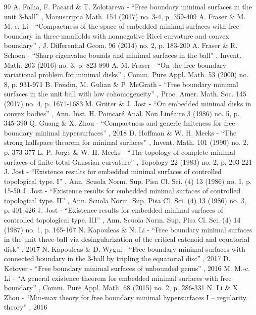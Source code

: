\documentclass[10pt]{amsart}
\theoremstyle{definition}
\begin{document}
\begin{thebibliography}{99}
 A. Folha, F. Pacard \& T. Zolotareva - “Free boundary minimal surfaces in the unit 3-ball” , Manuscripta Math. 154 (2017) no. 3-4, p. 359-409
 A. Fraser \& M. M.-c. Li - “Compactness of the space of embedded minimal surfaces with free boundary in three-manifolds with nonnegative Ricci curvature and convex boundary” , J. Differential Geom. 96 (2014) no. 2, p. 183-200
 A. Fraser \& R. Schoen - “Sharp eigenvalue bounds and minimal surfaces in the ball” , Invent. Math. 203 (2016) no. 3, p. 823-890
 A. M. Fraser - “On the free boundary variational problem for minimal disks” , Comm. Pure Appl. Math. 53 (2000) no. 8, p. 931-971
 B. Freidin, M. Gulian \& P. McGrath - “Free boundary minimal surfaces in the unit ball with low cohomogeneity” , Proc. Amer. Math. Soc. 145 (2017) no. 4, p. 1671-1683
 M. Grüter \& J. Jost - “On embedded minimal disks in convex bodies” , Ann. Inst. H. Poincaré Anal. Non Linéaire 3 (1986) no. 5, p. 345-390
 Q. Guang \& X. Zhou - “Compactness and generic finiteness for free boundary minimal hypersurfaces” , 2018
 D. Hoffman \& W. H. Meeks - “The strong halfspace theorem for minimal surfaces” , Invent. Math. 101 (1990) no. 2, p. 373-377
 L. P. Jorge \& W. H. Meeks - “The topology of complete minimal surfaces of finite total Gaussian curvature” , Topology 22 (1983) no. 2, p. 203-221
 J. Jost - “Existence results for embedded minimal surfaces of controlled topological type. I” , Ann. Scuola Norm. Sup. Pisa Cl. Sci. (4) 13 (1986) no. 1, p. 15-50
 J. Jost - “Existence results for embedded minimal surfaces of controlled topological type. II” , Ann. Scuola Norm. Sup. Pisa Cl. Sci. (4) 13 (1986) no. 3, p. 401-426
 J. Jost - “Existence results for embedded minimal surfaces of controlled topological type. III” , Ann. Scuola Norm. Sup. Pisa Cl. Sci. (4) 14 (1987) no. 1, p. 165-167
 N. Kapouleas \& N. Li - “Free boundary minimal surfaces in the unit three-ball via desingularization of the critical catenoid and equatorial disk” , 2017
 N. Kapouleas \& D. Wygul - “Free-boundary minimal surfaces with connected boundary in the 3-ball by tripling the equatorial disc” , 2017
 D. Ketover - “Free boundary minimal surfaces of unbounded genus” , 2016
 M. M.-c. Li - “A general existence theorem for embedded minimal surfaces with free boundary” , Comm. Pure Appl. Math. 68 (2015) no. 2, p. 286-331
 N. Li \& X. Zhou - “Min-max theory for free boundary minimal hypersurfaces I – regularity theory” , 2016

\end{thebibliography}
\end{document}
